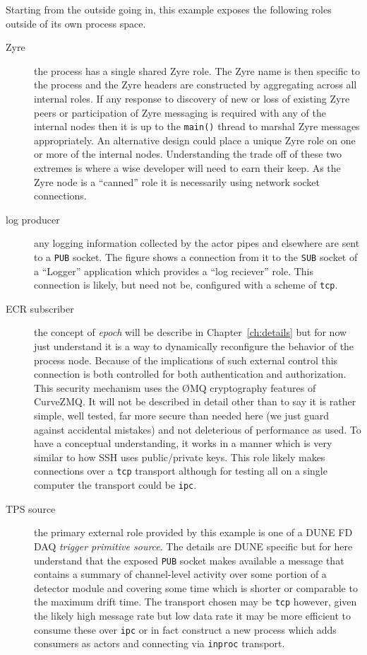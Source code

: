 \documentclass[letterpaper,oneside]{memoir}
\def\pub{\texttt{PUB}\xspace}
\def\sub{\texttt{SUB}\xspace}
\def\zmq{\O{}MQ\xspace}
\begin{document}
Starting from the outside going in, this example exposes the following roles outside of its own process  space.

\begin{description}
\item[Zyre] the process has a single shared Zyre role.  The Zyre name is then specific to the process and the Zyre headers are constructed by aggregating across all internal roles.  If any response to discovery of new or loss of existing Zyre peers or participation of Zyre messaging is required with any of the internal nodes then it is up to the \texttt{main()} thread to marshal Zyre messages appropriately.  An alternative design could place a unique Zyre role on one or more of the internal nodes.  Understanding the trade off of these two extremes is where a wise developer will need to earn their keep.  As the Zyre node is a ``canned'' role it is necessarily using network socket connections.  

\item[log producer] any logging information collected by the actor pipes and elsewhere are sent to a \pub socket.  The figure shows a connection from it to the \sub socket of a ``Logger'' application which provides a ``log reciever'' role.  This connection is likely, but need not be, configured with a scheme of \texttt{tcp}.

\item[ECR subscriber] the concept of \textit{epoch} will be describe in Chapter~\ref{ch:details} but for now just understand it is a way to dynamically reconfigure the behavior of the process node.
  Because of the implications of such external control this connection is both controlled for both authentication and authorization.  This security mechanism uses the \zmq cryptography features of CurveZMQ.  It will not be described in detail other than to say it is rather simple, well tested, far more secure than needed here (we just guard against accidental mistakes) and not deleterious of performance as used.  To have a conceptual understanding, it works in a manner which is very similar to how SSH uses public/private keys.  This role likely makes connections over a \texttt{tcp} transport although for testing all on a single computer the transport could be \texttt{ipc}.

\item[TPS source] the primary external role provided by this example is one of a DUNE FD DAQ \textit{trigger primitive source}. 
  The details are DUNE specific but for here understand that the exposed \pub socket makes available a message that contains a summary of channel-level activity over some portion of a detector module and covering some time which is shorter or comparable to the maximum drift time.  The transport chosen may be \texttt{tcp} however, given the likely high message rate but low data rate it may be more efficient to consume these over \texttt{ipc} or in fact construct a new process which adds consumers as actors and connecting via \texttt{inproc} transport.
\end{description}
\end{document}
